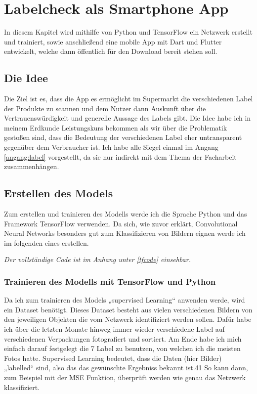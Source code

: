\section{Labelcheck als Smartphone App}\label{labelcheck}

In diesem Kapitel wird mithilfe von Python und TensorFlow ein Netzwerk erstellt und trainiert, sowie anschließend eine mobile App mit Dart und Flutter entwickelt, welche dann öffentlich für den Download bereit stehen soll.

\subsection{Die Idee}

Die Ziel ist es, dass die App es ermöglicht im Supermarkt die verschiedenen Label der Produkte zu scannen und dem Nutzer dann Auskunft über die Vertrauenswürdigkeit und generelle Aussage des Labels gibt. Die Idee habe ich in meinem Erdkunde Leistungskurs bekommen als wir über die Problematik gestoßen sind, dass die Bedeutung der verschiedenen Label eher untransparent gegenüber dem Verbraucher ist. Ich habe alle Siegel einmal im Angang \ref{angang:label} vorgestellt, da sie nur indirekt mit dem Thema der Facharbeit zusammenhängen.

\subsection{Erstellen des Models}\label{erstellen des modells}

Zum erstellen und trainieren des Modells werde ich die Sprache Python und das
Framework TensorFlow verwenden. Da sich, wie zuvor erklärt, Convolutional Neural Networks besonders gut zum Klassifizieren von Bildern eignen werde ich im folgenden eines erstellen. 

\emph{Der vollständige Code ist im Anhang unter \ref{tfcode} einsehbar.}

\subsubsection{Trainieren des Modells mit TensorFlow und Python}

Da ich zum trainieren des Models „supervised Learning“ anwenden werde, wird ein Dataset benötigt. Dieses Dataset besteht aus vielen verschiedenen Bildern von den jeweiligen Objekten die vom Netzwerk identifiziert werden sollen. Dafür habe ich über die letzten Monate hinweg immer wieder verschiedene Label auf verschiedenen Verpackungen fotografiert und sortiert. Am Ende habe ich mich einfach darauf festgelegt die 7 Label zu benutzen, von welchen ich die meisten Fotos hatte. Supervised Learning bedeutet, dass die Daten (hier Bilder) „labelled“ sind, also das das gewünschte Ergebniss bekannt ist.41 So kann dann, zum Beispiel mit der MSE Funktion, überprüft werden wie genau das Netzwerk klassifiziert.

